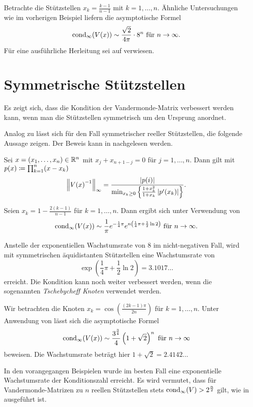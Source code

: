\begin{example}
    Betrachte die Stützstellen $x_k = \frac{k-1}{n-1}$ mit ${k=1, \dots, n}$.
    Ähnliche Untersuchungen wie im vorherigen Beispiel liefern die
    asymptotische Formel
    \[
        \cond[\infty]{\Vand{x}} \sim \frac{\sqrt{2}}{4\pi} \cdot 8^n \text{ für } n \rightarrow \infty.
    \]
    Für eine ausführliche Herleitung sei auf \cite[S. 344f]{gautschi3}
    verwiesen.
\end{example}

\section{Symmetrische Stützstellen}
Es zeigt sich, dass die Kondition der Vandermonde-Matrix verbessert werden
kann, wenn man die Stützstellen symmetrisch um den Ursprung anordnet.

Analog zu  lässt sich für den Fall
symmetrischer reeller Stützstellen, die folgende Aussage zeigen.
Der Beweis kann in \cite[S. 341]{gautschi3} nachgelesen werden.
\begin{lemma}
    \label{lemma:symmetric_real_nodes}
    Sei $x = (x_1, \dots, x_n) \in \Rn$ mit $x_j + x_{n+1-j} = 0$ für $j = 1, \dots, n$.
    Dann gilt mit $p(x) \defeq \prod_{k=1}^{n} (x - x_k)$
    \[
        \norm{\Vand{x}^{-1}}_\infty = \frac{\abs{p(i)}}{\min_{x_k \geq 0} \left\{ \frac{1 + x_k^2}{1 + x_k} \abs{p^{\prime}(x_k)} \right\} }.
    \]
\end{lemma}

\begin{example}
    Seien $x_k = 1 - \frac{2(k-1)}{n-1}$ für ${k = 1, \dots, n}$.
    Dann ergibt sich unter Verwendung von 
    \[
        \cond[\infty]{\Vand{x}} \sim \frac{1}{\pi} e^{-\frac{1}{4} \pi} e^{n\left( \frac{1}{4} \pi + \frac{1}{2} \ln 2 \right)} \text{ für } n \rightarrow \infty.
    \]
\end{example}

Anstelle der exponentiellen Wachstumsrate von $8$ im nicht-negativen Fall, wird mit
symmetrischen äquidistanten Stützstellen eine Wachstumsrate von
\[
    \exp \left( \frac{1}{4} \pi + \frac{1}{2} \ln 2 \right) = 3.1017\dots
\]
erreicht.
Die Kondition kann noch weiter verbessert werden, wenn die sogenannten
\emph{Tschebycheff Knoten} verwendet werden.

\begin{example}
    Wir betrachten die Knoten $x_k = \cos \left( \frac{(2k-1) \pi}{2n} \right)$
    für $k=1, \dots, n$.
    Unter Anwendung von  lässt sich die
    asymptotische Formel
    \[
        \cond[\infty]{\Vand{x}} \sim \frac{3^{\frac{3}{4}}}{4} \left( 1 + \sqrt{2} \right)^n \text{ für } n \rightarrow \infty
    \]
    beweisen.
    Die Wachstumsrate beträgt hier $1 + \sqrt{2} = 2.4142..$.
\end{example}

In den vorangegangen Beispielen wurde im besten Fall eine exponentielle
Wachstumsrate der Konditionszahl erreicht.
Es wird vermutet, dass für
Vandermonde-Matrizen zu $n$ reellen Stützstellen stets
$\cond[\infty]{V} > 2^{\frac{n}{2}}$ gilt, wie in \cite[S. 199]{gautschi1}
ausgeführt ist.
